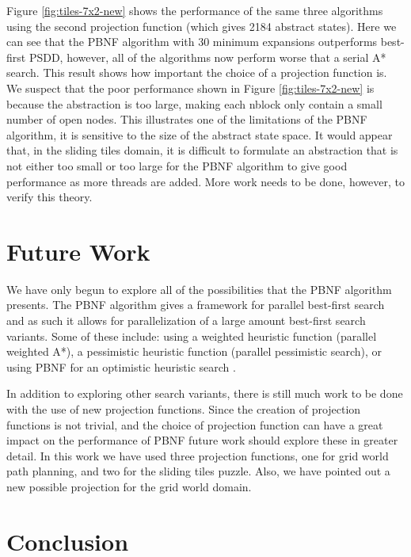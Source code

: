 \documentclass{article}
\begin{document}
 Figure \ref{fig:tiles-7x2-new} shows the performance of the same three
 algorithms using the second projection function (which gives 2184
 abstract states).  Here we can see that the PBNF algorithm with 30
 minimum expansions outperforms best-first PSDD, however, all of the
 algorithms now perform worse that a serial A* search.  This result
 shows how important the choice of a projection function is.  We
 suspect that the poor performance shown in Figure
 \ref{fig:tiles-7x2-new} is because the abstraction is too large,
 making each nblock only contain a small number of open nodes.  This
 illustrates one of the limitations of the PBNF algorithm, it is
 sensitive to the size of the abstract state space.  It would appear
 that, in the sliding tiles domain, it is difficult to formulate an
 abstraction that is not either too small or too large for the PBNF
 algorithm to give good performance as more threads are added.  More
 work needs to be done, however, to verify this theory.

 \section{Future Work}

 We have only begun to explore all of the possibilities that the PBNF
 algorithm presents.  The PBNF algorithm gives a framework for parallel
 best-first search and as such it allows for parallelization of a large
 amount best-first search variants.  Some of these include: using a
 weighted heuristic function (parallel weighted A*), a pessimistic
 heuristic function (parallel pessimistic search), or using PBNF for an
 optimistic heuristic search \cite{thayer:fas}.

In addition to exploring other search variants, there is still much
work to be done with the use of new projection functions.  Since the
creation of projection functions is not trivial, and the choice of
projection function can have a great impact on the performance of PBNF
future work should explore these in greater detail.  In this work we
have used three projection functions, one for grid world path
planning, and two for the sliding tiles puzzle.  Also, we have pointed
out a new possible projection for the grid world domain.

\section{Conclusion}
\end{document}
